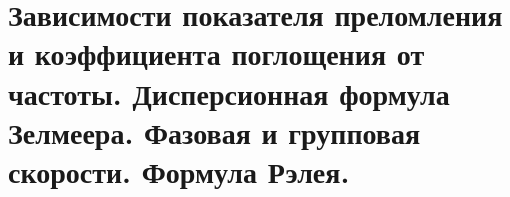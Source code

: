 \section{Зависимости показателя преломления и коэффициента поглощения от частоты. Дисперсионная формула Зелмеера. Фазовая и групповая скорости. Формула Рэлея.}